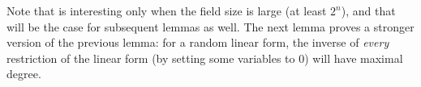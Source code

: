 \documentclass[11pt]{article}
\newtheorem{lemma}[theorem]{Lemma}
\newcommand{\Boo}{\{0,1 \}}
\newcommand{\F}{\mathbb{F}}
\begin{document}
Note that  is interesting only when the field size is large (at least $2^n$), and that will be the case for subsequent lemmas as well. The next lemma proves a stronger version of the previous lemma: for a random linear form, the inverse of \emph{every} restriction of the linear form (by setting some variables to 0) will have maximal degree.
\end{document}
